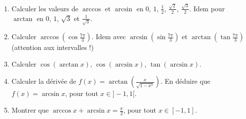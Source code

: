 \begin{frame}
\begin{miniexercice}
\begin{enumerate}
  \item Calculer les valeurs de $\arccos$ et $\arcsin$ en
  $0$, $1$, $\frac12$, $\frac{\sqrt2}{2}$, $\frac{\sqrt3}{2}$. Idem pour
  $\arctan$ en $0$, $1$, $\sqrt3$ et $\frac{1}{\sqrt3}$.
  
  \item Calculer $\arccos(\cos \frac{7\pi}{3})$. Idem avec $\arcsin(\sin \frac{7\pi}{3})$
  et $\arctan(\tan \frac{7\pi}{3})$ (attention aux intervalles !)
  
  \item Calculer $\cos(\arctan x)$, $\cos(\arcsin x)$, $\tan(\arcsin x)$.
  
  \item Calculer la dérivée de $f(x)=\arctan\left(\frac{x}{\sqrt{1-x^2}}\right)$. 
  En déduire que $f(x)= \arcsin x$, pour tout $x\in]-1,1[$.
  
  \item Montrer que $\arccos x + \arcsin x = \frac\pi2$, pour tout $x \in[-1,1]$.
\end{enumerate}
\end{miniexercice}


\end{frame}


